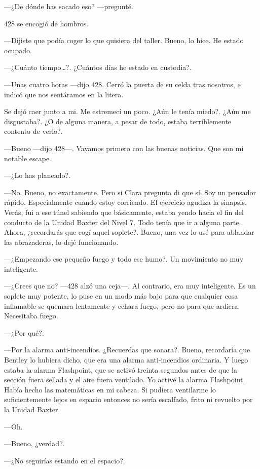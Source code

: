 ---¿De dónde has sacado eso? ---pregunté.

428 se encogió de hombros.

---Dijiste que podía coger lo que quisiera del taller. Bueno, lo hice.
He estado ocupado.

---¿Cuánto tiempo\ldots{}?. ¿Cuántos días he estado en custodia?.

---Unas cuatro horas ---dijo 428. Cerró la puerta de su celda tras
nosotros, e indicó que nos sentáramos en la litera.

Se dejó caer junto a mi. Me estremecí un poco. ¿Aún le tenía miedo?.
¿Aún me disgustaba?. ¿O de alguna manera, a pesar de todo, estaba
terriblemente contento de verlo?.

---Bueno ---dijo 428---. Vayamos primero con las buenas noticias. Que
son mi notable escape.

---¿Lo has planeado?.

---No. Bueno, no exactamente. Pero si Clara pregunta di que sí. Soy un
pensador rápido. Especialmente cuando estoy corriendo. El ejercicio
agudiza la sinapsis. Verás, fui a ese túnel sabiendo que básicamente,
estaba yendo hacia el fin del conducto de la Unidad Baxter del Nivel 7.
Todo tenía que ir a alguna parte. Ahora, ¿recordarás que cogí aquel
soplete?. Bueno, una vez lo usé para ablandar las abrazaderas, lo dejé
funcionando.

---¿Empezando ese pequeño fuego y todo ese humo?. Un movimiento no muy
inteligente.

---¿Crees que no? ---428 alzó una ceja---. Al contrario, era muy
inteligente. Es un soplete muy potente, lo puse en un modo más bajo para
que cualquier cosa inflamable se quemara lentamente y echara fuego, pero
no para que ardiera. Necesitaba fuego.

---¿Por qué?.

---Por la alarma anti-incendios. ¿Recuerdas que sonara?. Bueno,
recordaría que Bentley lo hubiera dicho, que era una alarma
anti-incendios ordinaria. Y luego estaba la alarma Flashpoint, que se
activó treinta segundos antes de que la sección fuera sellada y el aire
fuera ventilado. Yo activé la alarma Flashpoint. Había hecho las
matemáticas en mi cabeza. Si pudiera ventilarme lo suficientemente lejos
en espacio entonces no sería escalfado, frito ni revuelto por la Unidad
Baxter.

---Oh.

---Bueno, ¿verdad?.

---¿No seguirías estando en el espacio?.

